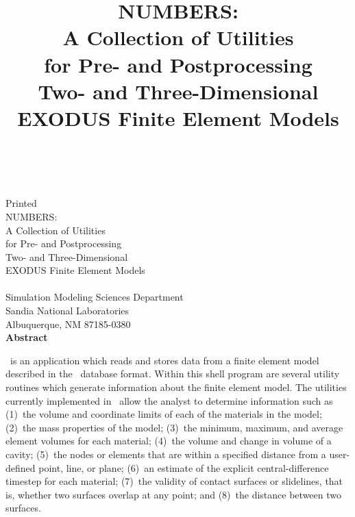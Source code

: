 \newif\ifdraft\draftfalse
\newif\ifsand\sandtrue

\SANDprintDate{\today}
\newcommand{\theTitle}{{\bold\sf NUMBERS}:\\
       A Collection of Utilities \\
       for Pre- and Postprocessing \\
       Two- and Three-Dimensional \\
       EXODUS Finite Element Models}
\title{\theTitle}
\ifsand
{}
\doCover
\newpage
\else
\SANDmarks{cover}
\setcounter{page}{3}
\fi


\begin{center}
\SANDnumVar\\
\SANDreleaseTypeVar\\
\ifdraft
Draft Date: \SANDprintDateVar\\
\else
Printed \SANDprintDateVar\\
\fi

\vspace{0.65in}
\theTitle\\
\vspace{0.65in}
\SANDauthorVar\\
Simulation Modeling Sciences Department\\
Sandia National Laboratories\\
Albuquerque, NM 87185-0380\\
\vspace*{.5in}
\textbf{Abstract}
\end{center}
\numbers\ is an application which reads and stores data from a finite
element model described in the \exo\ database format. Within this shell
program are several utility routines which generate information about
the finite element model.  The utilities currently implemented in
\numbers\ allow the analyst to determine information such as (1)~the
volume and coordinate limits of each of the materials in the model;
(2)~the mass properties of the model; (3)~the minimum, maximum, and
average element volumes for each material; (4)~the volume and change in
volume of a cavity; (5)~the nodes or elements that are within a
specified distance from a user-defined point, line, or plane; (6)~an
estimate of the explicit central-difference timestep for each material;
(7)~the validity of contact surfaces or slidelines, that is, whether two
surfaces overlap at any point; and (8)~the distance between two
surfaces.
